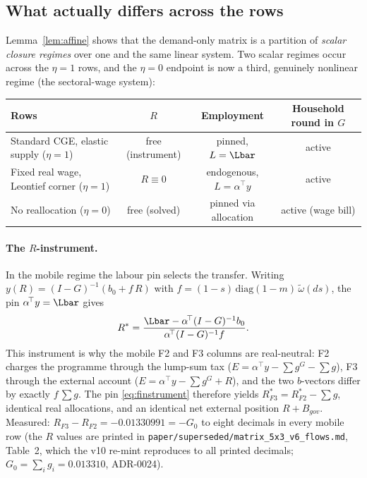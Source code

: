 \subsection{What actually differs across the rows}\label{sec:gauge}

Lemma~\ref{lem:affine} shows that the demand-only matrix is a partition of
\emph{scalar closure regimes} over one and the same linear system.
Two scalar regimes occur across the $\eta = 1$
rows, and the $\eta = 0$ endpoint is now a third, genuinely nonlinear
regime (the sectoral-wage system):

\begin{center}
{\small
\begin{tabular}{lccc}
\toprule
Rows & $R$ & Employment & Household round in $G$ \\
\midrule
Standard CGE, elastic supply ($\eta = 1$) & free (instrument) & pinned, $L = \Lbar$ & active \\
Fixed real wage, Leontief corner ($\eta = 1$) & $R \equiv 0$ & endogenous, $L = \alpha^{\!\top}y$ & active \\
No reallocation ($\eta = 0$) & free (solved) & pinned via allocation & active (wage bill) \\
\bottomrule
\end{tabular}
}
\end{center}

\paragraph{The $R$-instrument.} In the mobile regime the labour pin selects
the transfer. Writing $y(R) = (I-G)^{-1}(b_0 + f\,R)$ with
$f = (1-s)\,\mathrm{diag}(1-m)\,\tilde\omega(ds)$, the pin
$\alpha^{\!\top}y = \Lbar$ gives
\begin{equation}
R^{\ast} = \frac{\Lbar - \alpha^{\!\top}(I-G)^{-1} b_0}
               {\alpha^{\!\top}(I-G)^{-1} f}.
\label{eq:finstrument}
\end{equation}
This instrument is why the mobile F2 and F3 columns are real-neutral: F2
charges the programme through the lump-sum tax ($E = \alpha^{\!\top}y -
\sum g^G - \sum g$), F3 through the external account ($E = \alpha^{\!\top}y
- \sum g^G + R$), and the two $b$-vectors differ by exactly
$f\,\sum g$. The pin \eqref{eq:finstrument} therefore yields
$R^{\ast}_{F3} = R^{\ast}_{F2} - \sum g$, identical real allocations, and
an identical net external position $R + B_{gov}$. Measured: $R_{F3} - R_{F2} = -0.01330991 = -G_0$ to eight
decimals in every mobile row (the $R$ values are printed
in \texttt{paper/superseded/matrix\_5x3\_v6\_flows.md}, Table~2, which the v10
re-mint reproduces to all printed decimals; $G_0 = \sum_i g_i = 0.013310$,
ADR-0024).


